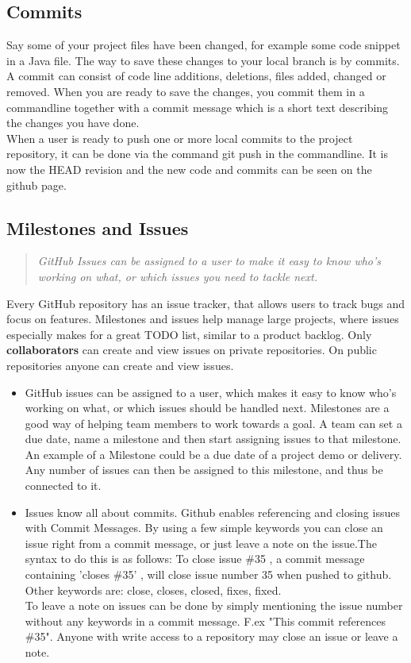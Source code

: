 \subsection{Commits}
Say some of your project files have been changed, for example some code snippet in a Java file. The way to save these changes to your local branch is by commits. A commit can consist of code line additions, deletions, files added, changed or removed. When you are ready to save the changes, you commit them in a commandline together with a commit message which is a short text describing the changes you have done. \\
When a user is ready to push one or more local commits to the project repository, it can be done via the command git push in the commandline. It is now the HEAD revision and the new code and commits can be seen on the github page.
\subsection{Milestones and Issues}
\begin{quote}
\em GitHub Issues can be assigned to a user to make it easy to know who's working on what, or which issues you need to tackle next.
\end{quote}
Every GitHub repository has an issue tracker, that allows users to track bugs and focus on features. Milestones and issues help manage large projects, where issues especially makes for a great TODO list, similar to a product backlog. Only {\bf collaborators} can create and view issues on private repositories. On public repositories anyone can create and view issues. 
\begin{itemize}
\item GitHub issues can be assigned to a user, which makes it easy to know who's working on what, or which issues should be handled next. Milestones are a good way of helping team members to work towards a goal. A team can set a due date, name a milestone and then start assigning issues to that milestone. An example of a Milestone could be a due date of a project demo or delivery. Any number of issues can then be assigned to this milestone, and thus be connected to it. 
\item Issues know all about commits. Github enables referencing and closing issues with Commit Messages. By using a few simple keywords you can close an issue right from a commit message, or just leave a note on the issue.The syntax to do this is as follows: To close issue \#35 , a commit message containing 'closes \#35' , will close issue number 35 when pushed to github. Other keywords are: close, closes, closed, fixes, fixed. \\
To leave a note on issues can be done by simply mentioning the issue number without any keywords in a commit message. F.ex "This commit references \#35". Anyone with write access to a repository may close an issue or leave a note.
\end{itemize}

